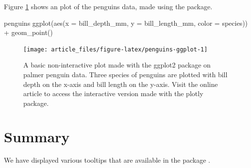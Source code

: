 Figure \ref{fig:penguins-ggplot} shows an plot of the penguins data,
made using the  package.

\begin{Schunk}
\begin{Sinput}
penguins %
  ggplot(aes(x = bill_depth_mm, y = bill_length_mm, 
             color = species)) + 
  geom_point()
\end{Sinput}
\begin{figure}
\texttt{[image: article\_files/figure-latex/penguins-ggplot-1]} \caption[A basic non-interactive plot made with the ggplot2 package on palmer penguin data]{A basic non-interactive plot made with the ggplot2 package on palmer penguin data. Three species of penguins are plotted with bill depth on the x-axis and bill length on the y-axis. Visit the online article to access the interactive version made with the plotly package.}\label{fig:penguins-ggplot}
\end{figure}
\end{Schunk}

\hypertarget{summary}{%
\section{Summary}\label{summary}}

We have displayed various tooltips that are available in the package
.



\address{%
Quietest Quokka\\
University of Little Mates\\%
Department of Letter Q\\ Somewhere, Australia\\
%
\url{https://www.britannica.com/animal/quokka}\\%
\textit{ORCiD: \href{https://orcid.org/0000-1721-1511-1101}{0000-1721-1511-1101}}\\%
\href{mailto:qquo@ulm.edu}{\nolinkurl{qquo@ulm.edu}}%
}

\address{%
Bounciest Bilby\\
University of Little Mates\\%
Department of Letter B\\ Somewhere, Australia\\
%
\url{https://www.britannica.com/animal/bilby}\\%
\textit{ORCiD: \href{https://orcid.org/0000-0002-0912-0225}{0000-0002-0912-0225}}\\%
\href{mailto:bbil@ulm.edu}{\nolinkurl{bbil@ulm.edu}}%
}
